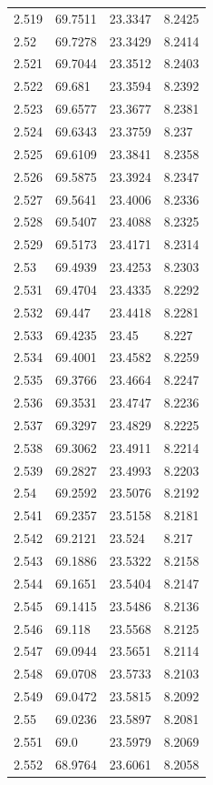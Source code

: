 \begin{tabular}{llll}
2.519 & 69.7511 & 23.3347 & 8.2425 \\
2.52 & 69.7278 & 23.3429 & 8.2414 \\
2.521 & 69.7044 & 23.3512 & 8.2403 \\
2.522 & 69.681 & 23.3594 & 8.2392 \\
2.523 & 69.6577 & 23.3677 & 8.2381 \\
2.524 & 69.6343 & 23.3759 & 8.237 \\
2.525 & 69.6109 & 23.3841 & 8.2358 \\
2.526 & 69.5875 & 23.3924 & 8.2347 \\
2.527 & 69.5641 & 23.4006 & 8.2336 \\
2.528 & 69.5407 & 23.4088 & 8.2325 \\
2.529 & 69.5173 & 23.4171 & 8.2314 \\
2.53 & 69.4939 & 23.4253 & 8.2303 \\
2.531 & 69.4704 & 23.4335 & 8.2292 \\
2.532 & 69.447 & 23.4418 & 8.2281 \\
2.533 & 69.4235 & 23.45 & 8.227 \\
2.534 & 69.4001 & 23.4582 & 8.2259 \\
2.535 & 69.3766 & 23.4664 & 8.2247 \\
2.536 & 69.3531 & 23.4747 & 8.2236 \\
2.537 & 69.3297 & 23.4829 & 8.2225 \\
2.538 & 69.3062 & 23.4911 & 8.2214 \\
2.539 & 69.2827 & 23.4993 & 8.2203 \\
2.54 & 69.2592 & 23.5076 & 8.2192 \\
2.541 & 69.2357 & 23.5158 & 8.2181 \\
2.542 & 69.2121 & 23.524 & 8.217 \\
2.543 & 69.1886 & 23.5322 & 8.2158 \\
2.544 & 69.1651 & 23.5404 & 8.2147 \\
2.545 & 69.1415 & 23.5486 & 8.2136 \\
2.546 & 69.118 & 23.5568 & 8.2125 \\
2.547 & 69.0944 & 23.5651 & 8.2114 \\
2.548 & 69.0708 & 23.5733 & 8.2103 \\
2.549 & 69.0472 & 23.5815 & 8.2092 \\
2.55 & 69.0236 & 23.5897 & 8.2081 \\
2.551 & 69.0 & 23.5979 & 8.2069 \\
2.552 & 68.9764 & 23.6061 & 8.2058 \\

\end{tabular}
